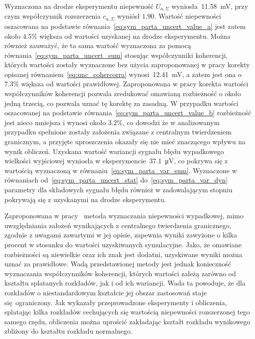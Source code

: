 Wyznaczona na drodze eksperymentu niepewność $U_{a,\Sigma}$ wyniosła~\qty{11.58}{mV}, przy czym współczynnik rozszerzenia $c_{a,\Sigma}$ wyniósł $1.90$. Wartość niepewności oszacowana na podstawie równania~\eqref{eq:sym_parta_uncert_value_a} jest zatem około $4.5\%$ większa od wartości uzyskanej na drodze eksperymentu. Można również zauważyć, że ta sama wartość wyznaczona za pomocą równania~\eqref{eq:sym_parta_uncert_sum} stosując współczynniki koherencji, których wartości zostały wyznaczone bez użycia zaproponowanej w pracy korekty opisanej równaniem~\eqref{eq:unc_cohercorra} wynosi~\qty{12.41}{mV}, a zatem jest ona o $7.3\%$ większa od wartości prawidłowej. Zaproponowana w pracy korekta wartości współczynników koherencji pozwala zredukować omawianą rozbieżność o około jedną trzecią, co pozwala uznać tę korektę za zasadną. W przypadku wartości oszacowanej na podstawie równania~\eqref{eq:sym_parta_uncert_value_b} rozbieżność jest nieco mniejsza i wynosi około $3.2\%$, co dowodzi że w analizowanym przypadku spełnione zostały założenia związane z centralnym twierdzeniem granicznym, a przyjęte uproszczenia okazały się nie mieć znaczącego wpływu na wynik obliczeń. Uzyskana wartość wariancji sygnału błędu wypadkowego wielkości wyjściowej wyniosła w eksperymencie~\qty{37.1}{\micro V}, co pokrywa się z wartością wyznaczoną w równaniu~\eqref{eq:sym_parta_var_sum}. Wyznaczone w równaniach od~\eqref{eq:sym_parta_uncert_stat} do~\eqref{eq:sym_parta_var_dyn} parametry dla składowych sygnału błędu również w zadowalającym stopniu pokrywają się z uzyskanymi na drodze eksperymentu.

Zaproponowana w pracy~\cite{jakubiec_system} metoda wyznaczania niepewności wypadkowej, mimo uwzględniania założeń wynikających z centralnego twierdzenia granicznego, zgodnie z uwagami zawartymi w jej opisie, zapewnia wyniki zawyżone o kilka procent w stosunku do wartości uzyskiwanych symulacyjne. Jako, że omawiane rozbieżności są niewielkie oraz ich znak jest dodatni, uzyskiwane wyniki można uznać za prawidłowe. Wadą przedstawionej metody jest jednak konieczność wyznaczania współczynników koherencji, których wartości zależą zarówno od kształtu splatanych rozkładów, jak i od ich wariancji. Wada ta powoduje, że dla rozkładów o niestandardowym kształcie jej obszar zastosowań staje się ograniczony. Jak wykazały przeprowadzone eksperymenty i obliczenia, splatając kilka rozkładów cechujących się wartością niepewności rozszerzonej tego samego rzędu, obliczenia można uprościć zakładając kształt rozkładu wynikowego zbliżony do kształtu rozkładu normalnego.

